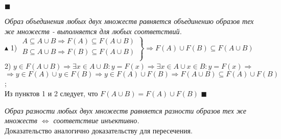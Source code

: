 $\blacksquare$ \\
\par
\emph{ Образ объединения любых двух множеств равняется объединению образов тех же множеств - выполняется для любых соответствий. } \\
$\blacktriangle$
1) $\left.
  \begin{array}{ccc}
    A \subseteq A \cup B \Rightarrow F(A) \subseteq F(A \cup B) \\
    B \subseteq A \cup B \Rightarrow F(B) \subseteq F(A \cup B) \\
  \end{array}
\right\} \Rightarrow F(A) \cup F(B) \subseteq F(A \cup B) $ \\
2) $y \in F(A \cup B) \Rightarrow \exists x \in A \cup B: y = F(x) \Rightarrow \exists x \in A \cup x \in B: y = F(x) \Rightarrow$ \\
$\Rightarrow y \in F(A) \cup y \in F(B) \Rightarrow y \in F(A) \cup F(B) \Rightarrow  F(A \cup B) \subseteq F(A) \cup F(B) $; \\
Из пунктов 1 и 2 следует, что $F(A \cup B) = F(A) \cup F(B) $
$\blacksquare$ \\
\par
\emph{ Образ разности любых двух множеств равняется разности образов тех же множеств $\iff$ соответствие инъективно. } \\
Доказательство аналогично доказательству для пересечения.